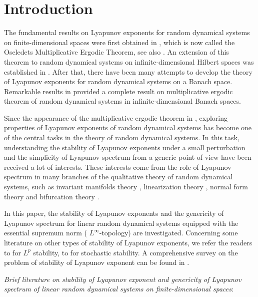 \documentclass[pdflatex,sn-mathphys-num]{sn-jnl}%
\theoremstyle{thmstyleone}%
\theoremstyle{thmstyletwo}%
\theoremstyle{thmstylethree}%
\numberwithin{equation}{section}
\begin{document}
\tableofcontents


\section{Introduction}
The fundamental results on Lyapunov exponents for random dynamical systems on finite-dimensional spaces were first obtained in \cite{Oseledets}, which is now called the Oseledets Multiplicative Ergodic Theorem, see also  \cite{Arnold, Filip}. An extension of this theorem to random dynamical systems on infinite-dimensional Hilbert spaces was established in \cite{Ruelle_1982}. After that, there have been many attempts to develop the theory of Lyapunov exponents for random dynamical systems on a Banach space. Remarkable results in \cite{LianLu2010,Cecilia,Cecilia15} provided a complete result on multiplicative ergodic theorem of random dynamical systems in infinite-dimensional Banach spaces.

Since the appearance of the multiplicative ergodic theorem in \cite{Oseledets}, exploring properties of Lyapunov exponents of random dynamical systems has become one of the central tasks in the theory of random dynamical systems. In this task, understanding the stability of Lyapunov exponents under a small perturbation and the simplicity of Lyapunov spectrum from a generic point of view have been received a lot of interests. These interests come from the role of Lyapunov spectrum in many branches of the qualitative theory of random dynamical systems, such as invariant manifolds theory \cite{Arnold,LianLu2010,LiLuBates14}, linearization theory \cite{LuZhangZhang_2020,Wanner,Zhao}, normal form theory \cite{LiLu05a,LiLu2016,LiLu2008,LiLu05} and bifurcation theory \cite{Doan18,Crauel1998,Engel2019}. 

In this paper,  the stability of Lyapunov exponents and the genericity of Lyapunov spectrum for linear random dynamical systems equipped with the essential supremum norm (  $L^{\infty}$-topology) are investigated. Concerning some literature on other types of stability of Lyapunov exponents, we refer the readers to \cite{Arbieto,BessaVilarinho} for $L^p$ stability, to \cite{Ledrappier,Bogenschutz,Froyland,Froyland19} for stochastic stability. A comprehensive survey on the problem of stability of Lyapunov exponent can be found in \cite{Viana2014,Viana2020}.

\emph{Brief literature on stability of Lyapunov exponent and genericity of Lyapunov spectrum of linear random dynamical systems on finite-dimensional spaces}:  
\end{document}
